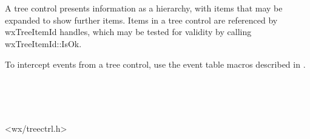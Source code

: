 
\section{}\label{wxtreectrl}

A tree control presents information as a hierarchy, with items that may be expanded
to show further items. Items in a tree control are referenced by wxTreeItemId handles,
which may be tested for validity by calling wxTreeItemId::IsOk.

To intercept events from a tree control, use the event table macros described in .


\\
\\
\\


<wx/treectrl.h>


